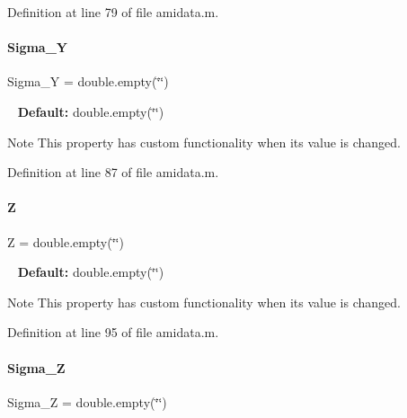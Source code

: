 Definition at line 79 of file amidata.\+m.

\mbox{\label{classamidata_a4bd82fb17b03a0039c2f0347ec8dc393}} 
\paragraph{\texorpdfstring{Sigma\+\_\+Y}{Sigma\_Y}}
{\footnotesize\ttfamily Sigma\+\_\+Y = double.\+empty(\char`\"{}\char`\"{})}

~\newline
{\bfseries Default\+:} double.\+empty(\char`\"{}\char`\"{})

\begin{DoxyNote}{Note}
This property has custom functionality when its value is changed. 
\end{DoxyNote}


Definition at line 87 of file amidata.\+m.

\mbox{\label{classamidata_adc18d83abfd9f87d396e8fd6b6ac0fe1}} 
\paragraph{\texorpdfstring{Z}{Z}}
{\footnotesize\ttfamily Z = double.\+empty(\char`\"{}\char`\"{})}

~\newline
{\bfseries Default\+:} double.\+empty(\char`\"{}\char`\"{})

\begin{DoxyNote}{Note}
This property has custom functionality when its value is changed. 
\end{DoxyNote}


Definition at line 95 of file amidata.\+m.

\mbox{\label{classamidata_a77b1f0ddcfbfb895b17d62a414d35673}} 
\paragraph{\texorpdfstring{Sigma\+\_\+Z}{Sigma\_Z}}
{\footnotesize\ttfamily Sigma\+\_\+Z = double.\+empty(\char`\"{}\char`\"{})}

